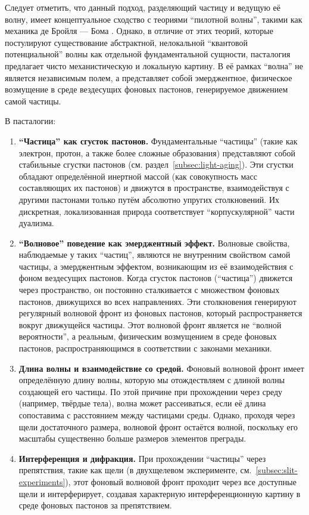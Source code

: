 \documentclass[pdflatex,sn-mathphys-num,referee]{sn-jnl}
\begin{document}
Следует отметить, что данный подход, разделяющий частицу и ведущую её волну, имеет концептуальное сходство с теориями ``пилотной волны'', такими как механика де Бройля — Бома \cite{bohm1952-interpretation}. Однако, в отличие от этих теорий, которые постулируют существование абстрактной, нелокальной ``квантовой потенциальной'' волны как отдельной фундаментальной сущности, пасталогия предлагает чисто механистическую и локальную картину. В её рамках ``волна'' не является независимым полем, а представляет собой эмерджентное, физическое возмущение в среде вездесущих фоновых пастонов, генерируемое движением самой частицы.

В пасталогии:
\begin{enumerate}
    \item \textbf{``Частица'' как сгусток пастонов.} Фундаментальные ``частицы'' (такие как электрон, протон, а также более сложные образования) представляют собой стабильные сгустки пастонов (см. раздел~\ref{subsec:light-aging}). Эти сгустки обладают определённой инертной массой (как совокупность масс составляющих их пастонов) и движутся в пространстве, взаимодействуя с другими пастонами только путём абсолютно упругих столкновений. Их дискретная, локализованная природа соответствует ``корпускулярной'' части дуализма.
    \item \textbf{``Волновое'' поведение как эмерджентный эффект.} Волновые свойства, наблюдаемые у таких ``частиц'', являются не внутренним свойством самой частицы, а эмерджентным эффектом, возникающим из её взаимодействия с фоном вездесущих пастонов. Когда сгусток пастонов (``частица'') движется через пространство, он постоянно сталкивается с множеством фоновых пастонов, движущихся во всех направлениях. Эти столкновения генерируют регулярный волновой фронт из фоновых пастонов, который распространяется вокруг движущейся частицы. Этот волновой фронт является не ``волной вероятности'', а реальным, физическим возмущением в среде фоновых пастонов, распространяющимся в соответствии с законами механики.
    \item \textbf{Длина волны и взаимодействие со средой.} Фоновый волновой фронт имеет определённую длину волны, которую мы отождествляем с длиной волны создающей его частицы. По этой причине при прохождении через среду (например, твёрдые тела), волна может рассеиваться, если её длина сопоставима с расстоянием между частицами среды. Однако, проходя через щели достаточного размера, волновой фронт остаётся волной, поскольку его масштабы существенно больше размеров элементов преграды.
    \item \textbf{Интерференция и дифракция.} При прохождении ``частицы'' через препятствия, такие как щели (в двухщелевом эксперименте, см.~\ref{subsec:slit-experiments}), этот фоновый волновой фронт проходит через все доступные щели и интерферирует, создавая характерную интерференционную картину в среде фоновых пастонов за препятствием.

\end{enumerate}
\end{document}
